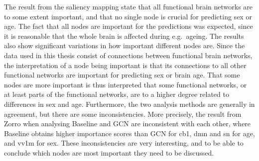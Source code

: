         


The result from the saliency mapping state that all functional brain networks are to some extent important, and that no single node is crucial for predicting sex or age. The fact that all nodes are important for the predictions was expected, since it is reasonable that the whole brain is affected during e.g.\ ageing. The results also show significant variations in how important different nodes are. Since the data used in this thesis consist of connections between functional brain networks, the interpretation of a node being important is that its connections to all other functional networks are important for predicting sex or brain age. That some nodes are more important is thus interpreted that some functional networks, or at least parts of the functional networks, are to a higher degree related to differences in sex and age. Furthermore, the two analysis methods are generally in agreement, but there are some inconsistencies. More precisely, the result from Zorro when analysing Baseline and GCN are inconsistent with each other, where Baseline obtains higher importance scores than GCN for \acrshort{cb1}, \acrshort{dmn} and \acrshort{sn} for age, and \acrshort{vv1m} for sex. These inconsistencies are very interesting, and to be able to conclude which nodes are most important they need to be discussed. 




